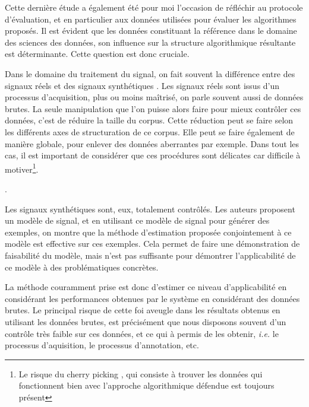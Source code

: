 Cette dernière étude a également été pour moi l'occasion de réfléchir au protocole d'évaluation, et en particulier aux données utilisées pour évaluer les algorithmes proposés. Il est évident que les données constituant la référence dans le domaine des sciences des données, son influence sur la structure algorithmique résultante est déterminante. Cette question est donc cruciale.

Dans le domaine du traitement du signal, on fait souvent la différence entre des signaux \og réels \fg et des signaux \og synthétiques \fg. Les signaux réels sont issus d'un processus d'acquisition, plus ou moins maîtrisé, on parle souvent aussi de données brutes. La seule manipulation que l'on puisse alors faire pour mieux contrôler ces données, c'est de réduire la taille du corpus. Cette réduction peut se faire selon les différents axes de structuration de ce corpus. Elle peut se faire également de manière globale, pour enlever des données aberrantes par exemple. Dans tout les cas, il est important de considérer que ces procédures sont délicates car difficile à motiver\footnote{Le risque du \og cherry picking \fg, qui consiste à trouver les données qui fonctionnent bien avec l'approche algorithmique défendue est toujours présent}.

.


Les signaux synthétiques sont, eux, totalement contrôlés. Les auteurs proposent un modèle de signal, et en utilisant ce modèle de signal pour générer des exemples, on montre que la méthode d'estimation proposée conjointement à ce modèle est effective sur ces exemples. Cela permet de faire une démonstration de faisabilité du modèle, mais n'est pas suffisante pour démontrer l'applicabilité de ce modèle à des problématiques concrètes.

La méthode couramment prise est donc d'estimer ce niveau d'applicabilité
en considérant les performances obtenues par le système en considérant des données brutes. Le principal risque de cette foi aveugle dans les résultats obtenus en utilisant les données brutes, est précisément que nous disposons souvent d'un contrôle très faible sur ces données, et ce qui à permis de les obtenir, \textit{i.e.} le processus d'aquisition, le processus d'annotation, etc.


